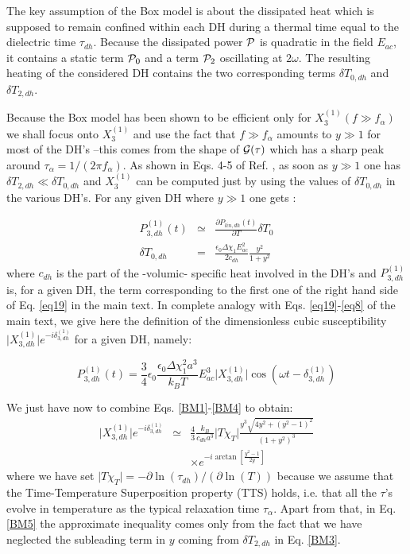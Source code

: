 \documentclass[single column,pre]{revtex4}
\begin{document}
 The key assumption of the Box model is about the dissipated heat which is supposed to remain confined within each DH during a thermal time equal to the dielectric 
 time $\tau_{dh}$. Because the dissipated power $\cal P$ is quadratic in the field $E_{ac}$, it contains a static term ${\cal P}_0$ and a term ${\cal P}_2$ oscillating at $2 \omega$. The resulting heating of the considered DH contains the two corresponding terms $\delta T_{0,dh}$ and $\delta T_{2,dh}$. 
 
 Because the Box model has been shown to be efficient only for $X_3^{(1)}(f \gg f_{\alpha})$ we shall focus onto $X_3^{(1)}$ and use the fact that $f \gg f_{\alpha}$ amounts to $y \gg 1$ for most of the DH's --this comes from the shape of ${\cal G}(\tau)$ which has a sharp peak around $\tau_{\alpha} = 1/(2\pi f_{\alpha})$. As shown in  Eqs. 4-5 of Ref. \cite{Bru11b}, as soon as $y \gg 1$ one has  $\delta T_{2,dh} \ll \delta T_{0,dh}$ and $X_{3}^{(1)}$ can be computed just by using the values of $\delta T_{0,dh}$ in the various DH's. For any given DH where $y \gg 1$ one gets \cite{Bru11b}:
 
\begin{eqnarray}
P_{3,dh}^{(1)}(t) & \simeq & \frac{\partial P_{lin,dh}(t)}{\partial T} \delta T_0 \label{BM3} \\
\delta T_{0,dh} &=& \frac{\epsilon_0 \Delta \chi_1 E_{ac}^2}{2c_{dh}} \frac{y^2}{1+y^2}  \label{BM2}
\end{eqnarray}
where $c_{dh}$ is the part of  the -volumic- specific heat involved in the DH's and $P_{3,dh}^{(1)}$ is, for a given DH, the term corresponding to the first one of the right hand side 
of Eq. \ref{eq19} in the main text. In complete analogy with  Eqs. \ref{eq19}-\ref{eq8} of the main text, we give here the definition of the dimensionless cubic susceptibility $\vert X_{3,dh}^{(1)}\vert e^{-i \delta_{3,dh}^{(1)}}$ for a given DH, namely:

\begin{equation}
P_{3,dh}^{(1)}(t) = \frac{3}{4} \epsilon_0 \frac{\epsilon_0 \Delta \chi_1^2 a^3}{k_B T} E_{ac}^3 \vert X_{3,dh}^{(1)} \vert \cos(\omega t - \delta_{3,dh}^{(1)})
\label{BM4}
\end{equation}

We just have now to combine Eqs. \ref{BM1}-\ref{BM4} to obtain:
\begin{eqnarray}
\vert X_{3,dh}^{(1)} \vert e^{ - i\delta_{3,dh}^{(1)}} &\simeq& \frac{4}{3} \frac{k_B}{c_{dh}a^3} \vert T \chi_T \vert \frac{y^3 \sqrt{4y^2+(y^2-1)^2}}{(1+y^2)^3} \nonumber \\
\ &\ &  \times e^{- i\arctan\left[ \frac{y^2-1}{2y}\right]}
\label{BM5}
\end{eqnarray}
where we have set $\vert T \chi_T \vert = - \partial \ln(\tau_{dh})/(\partial \ln(T))$ because we assume that the Time-Temperature Superposition property (TTS) holds, i.e. that all the $\tau$'s evolve in temperature as the typical 
relaxation time $\tau_{\alpha}$. Apart from that, in Eq. \ref{BM5} the approximate inequality comes only from the fact that we have neglected the subleading term in $y$ coming from  $\delta T_{2,dh}$ in Eq. \ref{BM3}.
  
\end{document}
